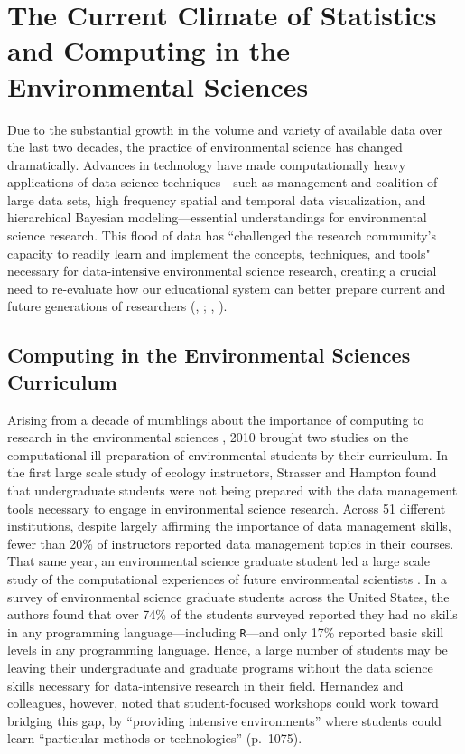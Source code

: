 \documentclass[12pt]{article}
\begin{document}
\section{The Current Climate of Statistics and Computing in the Environmental 
Sciences}
\label{sec:lit}

\quad Due to the substantial growth in the volume and variety of available data 
over the last two decades, the practice of environmental science has changed 
dramatically. Advances in technology have made computationally heavy 
applications of data science techniques---such as management and coalition of 
large data sets, high frequency spatial and temporal data visualization, and 
hierarchical Bayesian modeling---essential understandings for environmental 
science research. This flood of data has ``challenged the research community's 
capacity to readily learn and implement the concepts, techniques, and tools" 
\citep[p.\ 546]{hampton} necessary for data-intensive environmental science 
research, creating a crucial need to re-evaluate how our educational system can
better prepare current and future generations of researchers 
(\citeauthor{green}, \citeyear{green}; \citeauthor{hampton}, 
\citeyear{hampton}).  

\subsection{Computing in the Environmental Sciences Curriculum}

\quad Arising from a decade of mumblings about the importance of computing to 
research in the environmental sciences \citep{andelman, dodds1, dodds2, eglen, 
green, hastings, kelling, wilson-software-carpentry, wilson, wing}, 2010 brought
two studies on the computational ill-preparation of environmental students by
their curriculum. In the first large scale study of ecology instructors, 
Strasser and Hampton found that undergraduate students were not being prepared
with the data management tools necessary to engage in environmental science
research. Across 51 different institutions, despite largely affirming the
importance of data management skills, fewer than 20\% of instructors reported
data management topics in their courses. That same year, an environmental
science graduate student led a large scale study of the computational
experiences of future environmental scientists \citep[p.\ 1068]{hernandez}. In a
survey of environmental science graduate students across the United States, the
authors found that over 74\% of the students surveyed reported they had no
skills in any programming language---including \texttt{R}---and only 17\%
reported basic skill levels in any programming language. Hence, a large number
of students may be leaving their undergraduate and graduate programs without the
data science skills necessary for data-intensive research in their field. 
Hernandez and colleagues, however, noted that student-focused workshops could
work toward bridging this gap, by ``providing intensive environments'' where
students could learn ``particular methods or technologies'' (p.\ 1075).
\end{document}
